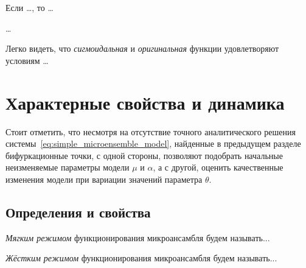 \begin{Theorem}
    Если \ldots, то \ldots
\end{Theorem}
\begin{Proof}
    \ldots
\end{Proof}

Легко видеть, что \textit{сигмоидальная} и \textit{оригинальная} функции удовлетворяют условиям \ldots

\newpage
\section{Характерные свойства и динамика} \label{section:neuron_dynamic}

Стоит отметить, что несмотря на отсутствие точного аналитического решения системы~\eqref{eq:simple_microensemble_model}, найденные в предыдущем разделе бифуркационные точки, с одной стороны, позволяют подобрать начальные неизменяемые параметры модели $\mu$ и $\alpha$, а с другой, оценить качественные изменения модели при вариации значений параметра $\theta$.

\subsection{Определения и свойства}

\begin{Definition}
    \textit{Мягким режимом} функционирования микроансамбля будем называть...
\end{Definition}

\begin{Definition}
    \textit{Жёстким режимом} функционирования микроансамбля будем называть...
\end{Definition}


%
%


